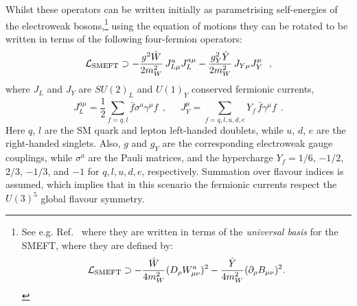 \documentclass[withindex,glossary]{cam-thesis}
\begin{document}
Whilst these operators can be written initially as parametrising self-energies of the 
electroweak bosons,\footnote{See e.g. Ref.~\cite{Englert:2019zmt} where they are written in terms of the \textit{universal basis} for the SMEFT, where they are defined by:
\begin{equation*}
\label{eq:WY}
\mathcal{L}_{\rm SMEFT} \supset -\frac{\hat{W}}{4 m_W^2} (D_\rho W^a_{\mu\nu})^2 -\frac{\hat{Y}}{4 m_W^2} (\partial_\rho B_{\mu\nu})^2.
\end{equation*}
} using the equation of motions they can be rotated to be written in terms of the following four-fermion operators:
\begin{equation} \label{eq:JJ}
\mathcal{L}_{\rm SMEFT} \supset -\frac{g^2 \hat{W}}{2 m_W^2} \, J^{a}_{L \mu} J^{a \mu}_L -\frac{ g_Y^2 \hat{Y} }{2 m_W^2} \, J_{Y \mu} J^\mu_Y ~~,
\end{equation}
where $J_L$ and $J_Y$ are $SU(2)_L$ and $U(1)_Y$ conserved fermionic currents,
\begin{equation}
J^{a \mu}_L =  \frac{1}{2} \sum_{f = q, l}  \bar f \sigma^a \gamma^\mu f ~~,\quad ~~ J^\mu_Y= \sum_{f = q, l, u, d, e}  Y_f\,\bar f \gamma^\mu f~~.
\end{equation}
Here $q$, $l$ are the SM quark and lepton left-handed doublets, while $u$, $d$, $e$ are 
the right-handed singlets. Also, $g$ and $g_Y$ are the corresponding electroweak gauge couplings,
while $\sigma^a$ 
are the Pauli matrices, and the hypercharge $Y_f = 1/6$, $-1/2$, $2/3$, $-1/3$, and $-1$ for $q,l,u,d,e$, respectively. Summation over flavour indices is assumed, which implies
that in this scenario the fermionic currents respect the $U(3)^5$
global flavour symmetry.
\end{document}
